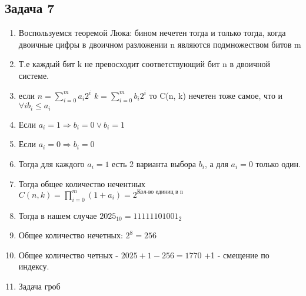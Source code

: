\documentclass[a4paper,12pt]{article}
\begin{document}
\subsection{Задача 7}
\begin{enumerate}
    \item Воспользуемся теоремой Люка: бином нечетен тогда и только тогда, когда двоичные цифры в двоичном разложении n являются подмножеством битов m
    \item Т.е каждый бит k не превосходит соответствующий бит n в двоичной системе.
    \item если $n=\sum_{i=0}^{m}a_i2^i$ $k=\sum_{i=0}^{m}b_i2^i$ то C(n, k) нечетен тоже самое, что и $\forall i b_i \le a_i$
    \item Если $a_i=1 \Rightarrow b_i = 0 \lor b_i=1$
    \item Если $a_i=0 \Rightarrow b_i=0$
    \item Тогда для каждого $a_i=1$ есть 2 варианта выбора $b_i$, а для $a_i=0$ только один.
    \item Тогда общее количество нечентных $C(n, k)=\prod_{i=0}^{m}(1+a_i)=2^{\text{Кол-во единиц в n}}$
    \item Тогда в нашем случае $2025_{10} = 11111101001_2$
    \item Общее количество нечетных: $2^8=256$
    \item Общее количество четных - $2025+1-256=1770$ +1 - смещение по индексу.
    \item Задача гроб
\end{enumerate}
\end{document}
